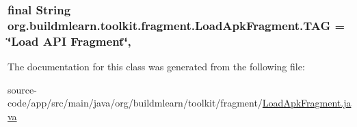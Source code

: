 \subsubsection[{\texorpdfstring{T\+AG}{TAG}}]{\setlength{\rightskip}{0pt plus 5cm}final String org.\+buildmlearn.\+toolkit.\+fragment.\+Load\+Apk\+Fragment.\+T\+AG = \char`\"{}Load A\+PI Fragment\char`\"{}\hspace{0.3cm}{\ttfamily [static]}, {\ttfamily [private]}}\hypertarget{classorg_1_1buildmlearn_1_1toolkit_1_1fragment_1_1LoadApkFragment_a6802d1e781be3f554576595f6f68f794}{}\label{classorg_1_1buildmlearn_1_1toolkit_1_1fragment_1_1LoadApkFragment_a6802d1e781be3f554576595f6f68f794}


The documentation for this class was generated from the following file\+:\begin{DoxyCompactItemize}
\item 
source-\/code/app/src/main/java/org/buildmlearn/toolkit/fragment/\hyperlink{LoadApkFragment_8java}{Load\+Apk\+Fragment.\+java}\end{DoxyCompactItemize}
